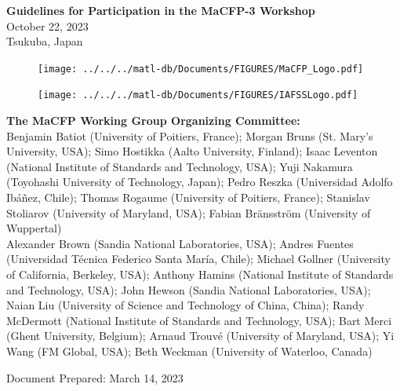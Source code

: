 \documentclass[12pt]{article}
\begin{document}

\thispagestyle{empty}

\begin{center}
{\bf\Large Guidelines for Participation in the MaCFP-3 Workshop} \\
{\large October 22, 2023\\Tsukuba, Japan}
\end{center}

\begin{figure}[h]
  \centering
  \texttt{[image: ../../../matl-db/Documents/FIGURES/MaCFP\_Logo.pdf]}
  \label{Cover_Image}
\end{figure}

\vfill

\begin{minipage}{0.25\textwidth}
\begin{figure}[H]
\texttt{[image: ../../../matl-db/Documents/FIGURES/IAFSSLogo.pdf]}
\end{figure}
\end{minipage} \hfill
\begin{minipage}{0.65\textwidth}
\begin{flushright}
\begin{small}
{\bf The MaCFP Working Group Organizing Committee:} \\
{\footnotesize Benjamin Batiot (University of Poitiers, France); Morgan Bruns (St. Mary's University, USA); Simo Hostikka (Aalto University, Finland); Isaac Leventon (National Institute of Standards and Technology, USA); Yuji Nakamura (Toyohashi University of Technology, Japan); Pedro Reszka (Universidad Adolfo Ibáñez, Chile); Thomas Rogaume (University of Poitiers, France); Stanislav Stoliarov (University of Maryland, USA); Fabian Bränsström (University of Wuppertal)}\\
{\footnotesize Alexander Brown (Sandia National Laboratories, USA); Andres Fuentes (Universidad Técnica Federico Santa María, Chile); Michael Gollner (University of California, Berkeley, USA); Anthony Hamins (National Institute of Standards and Technology, USA); John Hewson (Sandia National Laboratories, USA); Naian Liu (University of Science and Technology of China, China); Randy McDermott (National Institute of Standards and Technology, USA); Bart Merci (Ghent University, Belgium); Arnaud Trouvé (University of Maryland, USA); Yi Wang (FM Global, USA); Beth Weckman (University of Waterloo, Canada)}


\end{small}
\end{flushright}
\end{minipage}
\begin{small}
Document Prepared: March 14, 2023\\
\end{small}
\newpage
\thispagestyle{empty}
\tableofcontents
\end{document}
